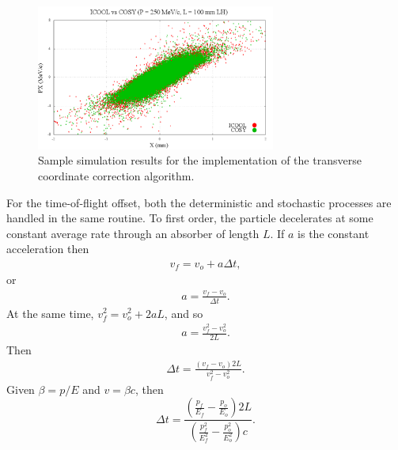 \begin{figure}[H]
  \centering
    \includegraphics[width=0.7\textwidth]{Figures/xpx_phase_space_implemented} 
  \caption{Sample simulation results for the implementation of the transverse coordinate correction algorithm.}
  \label{fig:xpx_phase_space_implemented}
\end{figure}
%
%
\label{sec:COSYTemporalDisplacement}\par
For the time-of-flight offset, both the deterministic and stochastic processes are handled in the same routine. To first order, the particle decelerates at some constant average rate through an absorber of length $L$. If $a$ is the constant acceleration then 
\begin{align*}
v_f=v_o+a\Delta t,
\end{align*}
or 
\begin{align*}
a=\frac{v_f-v_o}{\Delta t}.
\end{align*}
At the same time, $v_f ^2 = v_o ^2 + 2 a L$, and so
\begin{align*}
 a=\frac{v_f ^2 - v_o ^2}{2L}.
\end{align*}
Then
\begin{align*}
\Delta t = \frac{(v_f-v_o)2L}{v_f^2-v_o^2}.
\end{align*}
Given $\beta=p/E$ and $v=\beta c$, then
\begin{equation}\label{eqn:cosyDeltaT}
\Delta t=\frac{(\frac{p_f}{E_f}-\frac{p_o}{E_o})2L}{(\frac{p_f ^2}{E_f ^2}-\frac{p_o ^2}{E_o ^2})c}.
\end{equation}

